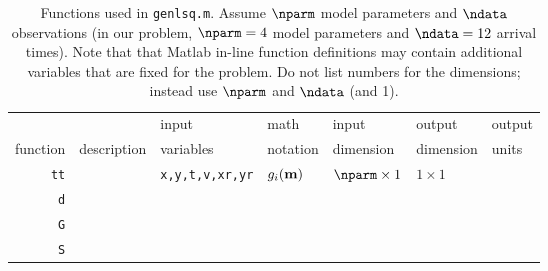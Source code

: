 \begin{table}[h]
\caption[]{{
Functions used in {\tt genlsq.m}.
Assume $\nparm$ model parameters and $\ndata$ observations (in our problem, $\nparm=4$ model parameters and $\ndata=12$ arrival times).
Note that that Matlab in-line function definitions may contain additional variables that are fixed for the problem.
Do not list numbers for the dimensions; instead use $\nparm$ and $\ndata$ (and 1).
\label{tab:funs}
}}
\begin{spacing}{4}
\hspace{-1.2cm}
\begin{tabular}{r|l|l|l|l|l|l}
\hline
         &                          & input      & math      & input     & output    & output \\
function & description \hspace{3cm} & variables  & notation  & dimension & dimension & units \hspace{0.5cm} \\
\hline\hline 
\verb+tt+ & & {\tt x,y,t,v,xr,yr} & $g_i(\mbox{${\bf m}$})$ & $\nparm \times 1$ & $1 \times 1$ & \\ \hline
\verb+d+  & & & & & & \\ \hline
\verb+G+  & & & & & & \\ \hline
\verb+S+  & & & & & & \\ \hline
\end{tabular}
\end{spacing}
\end{table}

